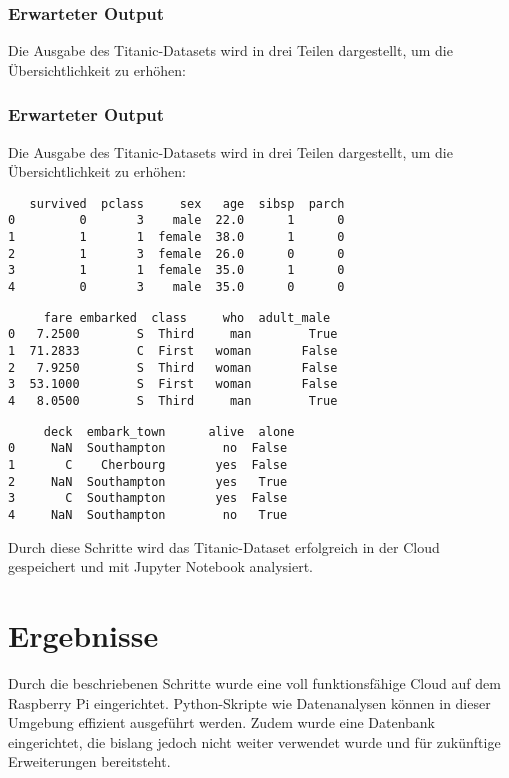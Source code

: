 \documentclass[a4paper,12pt]{article}
\begin{document}
\subsubsection{Erwarteter Output}
Die Ausgabe des Titanic-Datasets wird in drei Teilen dargestellt, um die Übersichtlichkeit zu erhöhen:

\subsubsection{Erwarteter Output}
Die Ausgabe des Titanic-Datasets wird in drei Teilen dargestellt, um die Übersichtlichkeit zu erhöhen:

\begin{lstlisting}
   survived  pclass     sex   age  sibsp  parch  
0         0       3    male  22.0      1      0  
1         1       1  female  38.0      1      0  
2         1       3  female  26.0      0      0  
3         1       1  female  35.0      1      0  
4         0       3    male  35.0      0      0  
\end{lstlisting}

\begin{lstlisting}
     fare embarked  class     who  adult_male  
0   7.2500        S  Third     man        True  
1  71.2833        C  First   woman       False  
2   7.9250        S  Third   woman       False  
3  53.1000        S  First   woman       False  
4   8.0500        S  Third     man        True  
\end{lstlisting}

\begin{lstlisting}
     deck  embark_town      alive  alone  
0     NaN  Southampton        no  False  
1       C    Cherbourg       yes  False  
2     NaN  Southampton       yes   True  
3       C  Southampton       yes  False  
4     NaN  Southampton        no   True  
\end{lstlisting}


Durch diese Schritte wird das Titanic-Dataset erfolgreich in der Cloud gespeichert und mit Jupyter Notebook analysiert.


\section{Ergebnisse}
Durch die beschriebenen Schritte wurde eine voll funktionsfähige Cloud auf dem Raspberry Pi eingerichtet. Python-Skripte wie Datenanalysen können in dieser Umgebung effizient ausgeführt werden. Zudem wurde eine Datenbank eingerichtet, die bislang jedoch nicht weiter verwendet wurde und für zukünftige Erweiterungen bereitsteht.
\end{document}
